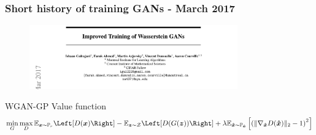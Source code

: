 \documentclass{Bredelebeamer}
\begin{document}
\begin{frame}
	\frametitle{Short history of training GANs - March 2017}
	\begin{figure}[h!]
		\centering
		\includegraphics[width=0.8\textwidth]{wgan_gp_paper.png}
	\end{figure}
	\begin{exampleblock}{WGAN-GP Value function}
	\begin{gather*}
		\min_G \max_{D}
		\mathbb{E}_{\bm{x} \sim \mathbb{P}_r} \Left[ D(\bm{x}) \Right] - 
		\mathbb{E}_{\bm{z} \sim \mathcal{Z}} \Left[ D(G(\bm{z}))  \Right] + 
		\lambda \mathbb{E}_{\bm{\hat{x}} \sim \mathbb{P}_{\bm{\hat{x}}}} \left[ \left( \Vert \nabla_{\bm{\hat{x}}} D(\bm{\hat{x}}) \Vert_2  - 1 \right)^2  \right]
	\end{gather*}
	\end{exampleblock}
\end{frame}

\end{document}
